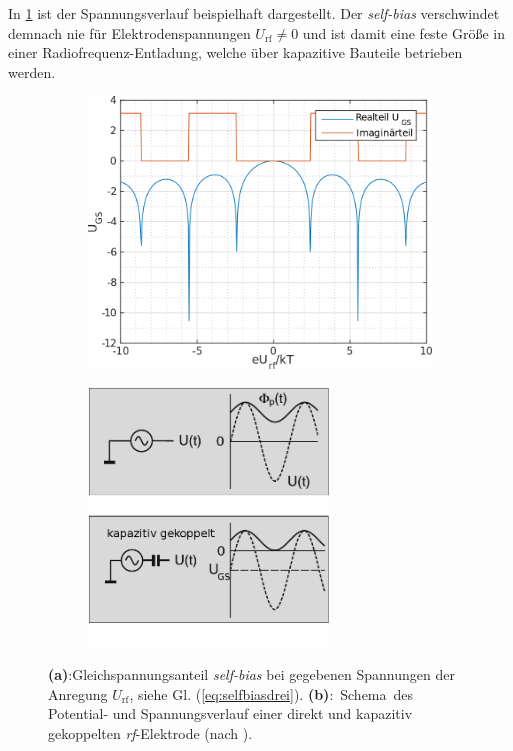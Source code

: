 \documentclass[numbers=noenddot,a4paper]{scrartcl}
\newcommand{\ix}[1]{_\text{#1}}
\newcommand{\tilt}[1]{\textit{#1}}
\newcommand{\fett}[1]{\textbf{#1}}
\begin{document}
					In \ref{img:imagundreal} ist der Spannungsverlauf beispielhaft dargestellt. Der \tilt{self-bias} verschwindet demnach nie für Elektrodenspannungen  $U\ix{rf}\neq0$ und ist damit eine feste Größe in einer Radiofrequenz-Entladung, welche über kapazitive Bauteile betrieben werden.

						\begin{figure}
							\centering
								\begin{subfigure}[t]{0.45\textwidth}
									\centering
									\includegraphics[width=\textwidth,height=0.8\textwidth]{figs/selfbiasselbst.png}
									\caption{}
									\label{img:imagundreal}
								\end{subfigure}
								\begin{subfigure}[t]{0.45\textwidth}
									\centering
									\includegraphics[width=0.7\textwidth,height=0.7\textwidth]{figs/kapazitivekopplungohneschemapiel.png}
									\vspace{-0.1cm}
									\caption{}
									\label{img:kapazitivgekoppelt}
								\end{subfigure}
								\caption{\fett{(a)}:Gleichspannungsanteil \tilt{self-bias} bei gegebenen Spannungen der Anregung $U\ix{rf}$, siehe Gl. (\ref{eq:selfbiasdrei}). \mbox{\fett{(b)}: Schema des} Potential- und Spannungsverlauf einer direkt und kapazitiv gekoppelten \tilt{rf}-Elektrode (nach \cite{Piel10}).}
						\end{figure}
\end{document}

